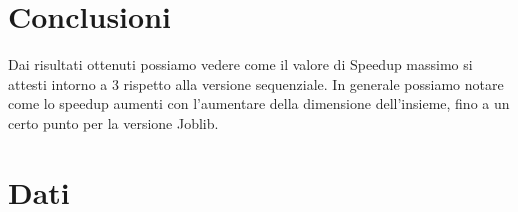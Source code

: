 \documentclass[11pt]{article}
\begin{document}
    \section{Conclusioni}\label{sec:conclusioni}
    Dai risultati ottenuti possiamo vedere come il valore di Speedup massimo si attesti intorno a 3 rispetto alla versione sequenziale.
    In generale possiamo notare come lo speedup aumenti con l'aumentare della dimensione dell'insieme, fino a un certo punto per la versione Joblib.

    \clearpage

    \section{Dati}\label{sec:dati}
    \begin{figure}[H]
        \label{fig:setup_csv}
    \end{figure}
    \begin{figure}[H]
        \label{fig:filter_csv}
    \end{figure}
    \begin{figure}[H]
        \label{fig:chunks_csv}
    \end{figure}
\end{document}

